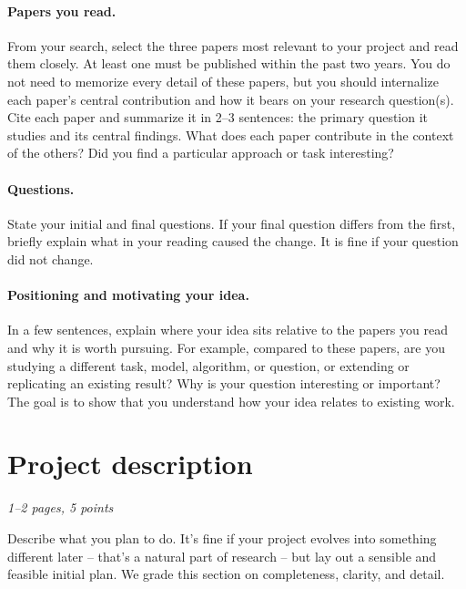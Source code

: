 \documentclass{article}
\newcommand{\note}[1]{#1}
\begin{document}
    \paragraph{Papers you read.}
        \note{From your search, select the three papers most relevant to your project and read them closely. At least one must be published within the past two years. You do not need to memorize every detail of these papers, but you should internalize each paper's central contribution and how it bears on your research question(s). Cite each paper and summarize it in 2--3 sentences: the primary question it studies and its central findings. What does each paper contribute in the context of the others? Did you find a particular approach or task interesting?}

    \paragraph{Questions.}
        \note{State your initial and final questions. If your final question differs from the first, briefly explain what in your reading caused the change. It is fine if your question did not change.}

    \paragraph{Positioning and motivating your idea.}
        \note{In a few sentences, explain where your idea sits relative to the papers you read and why it is worth pursuing. For example, compared to these papers, are you studying a different task, model, algorithm, or question, or extending or replicating an existing result? Why is your question interesting or important? The goal is to show that you understand how your idea relates to existing work.}

\section{Project description}
\label{sec:description}
\note{\textit{1--2 pages, 5 points}}

\begin{instructions}
Describe what you plan to do. It's fine if your project evolves into something different later -- that's a natural part of research -- but lay out a sensible and feasible initial plan. We grade this section on completeness, clarity, and detail.
\end{instructions}
\end{document}
